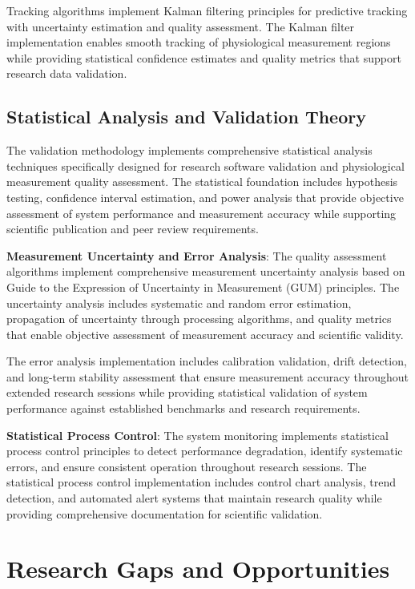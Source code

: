 \documentclass[11pt,a4paper]{report}
\begin{document}
Tracking algorithms implement Kalman filtering principles for predictive tracking with uncertainty estimation and quality assessment. The Kalman filter implementation enables smooth tracking of physiological measurement regions while providing statistical confidence estimates and quality metrics that support research data validation.

\subsection{Statistical Analysis and Validation Theory}

The validation methodology implements comprehensive statistical analysis techniques specifically designed for research software validation and physiological measurement quality assessment. The statistical foundation includes hypothesis testing, confidence interval estimation, and power analysis that provide objective assessment of system performance and measurement accuracy while supporting scientific publication and peer review requirements.

\noindent \textbf{Measurement Uncertainty and Error Analysis}: The quality assessment algorithms implement comprehensive measurement uncertainty analysis based on Guide to the Expression of Uncertainty in Measurement (GUM) principles. The uncertainty analysis includes systematic and random error estimation, propagation of uncertainty through processing algorithms, and quality metrics that enable objective assessment of measurement accuracy and scientific validity.

The error analysis implementation includes calibration validation, drift detection, and long-term stability assessment that ensure measurement accuracy throughout extended research sessions while providing statistical validation of system performance against established benchmarks and research requirements.

\noindent \textbf{Statistical Process Control}: The system monitoring implements statistical process control principles to detect performance degradation, identify systematic errors, and ensure consistent operation throughout research sessions. The statistical process control implementation includes control chart analysis, trend detection, and automated alert systems that maintain research quality while providing comprehensive documentation for scientific validation.

\section{Research Gaps and Opportunities}
\end{document}
